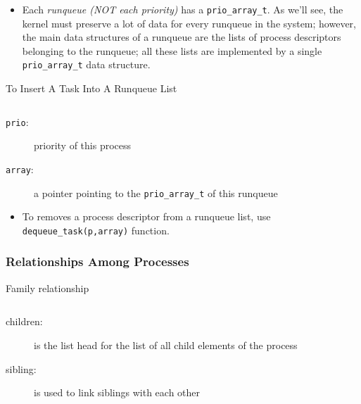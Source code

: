 \begin{itemize}
\item Each \emph{runqueue (NOT each priority)} has a
  \texttt{prio\_array\_t}.  As we'll see, the kernel must preserve a lot of
  data for every runqueue in the system; however, the main data structures of a runqueue
  are the lists of process descriptors belonging to the runqueue; all these lists are
  implemented by a single \texttt{prio\_array\_t} data structure.
\end{itemize}

\begin{frame}[fragile=singleslide]{To Insert A Task Into A Runqueue List}
  \inputminted[fontsize=\footnotesize]{c}{../figs/task-insert2.c}

  \begin{description}
  \item[\texttt{prio}:] priority of this process
  \item[\texttt{array}:] a pointer pointing to the \texttt{prio\_array\_t} of this runqueue
  \end{description}

  \begin{itemize}
  \item To removes a process descriptor from a runqueue list, use
    \texttt{dequeue\_task(p,array)} function.
  \end{itemize}
\end{frame}

\subsubsection{Relationships Among Processes}

\begin{frame}[fragile=singleslide]
  \begin{block}{Family relationship}
    \begin{center}
      \inputminted{c}{../figs/children.c}
    \end{center}
    \begin{description}
    \item[children:] is the list head for the list of all child elements of the process
    \item[sibling:] is used to link siblings with each other
    \end{description}
  \end{block}
\end{frame}

